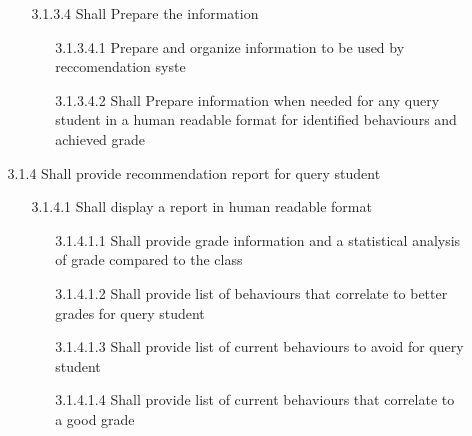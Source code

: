 \documentclass[12pt]{article}
\begin{document}
\begin{enumerate}[itemsep=-1mm]
\begin{enumerate}[itemsep=-1mm]
\begin{enumerate}[itemsep=-1mm]
				\item[3.1.3.4] Shall Prepare the information
				\begin{enumerate}[itemsep=-1mm]
					\item[3.1.3.4.1] Prepare and organize information to be used by reccomendation syste
					\item[3.1.3.4.2] Shall Prepare information when needed for any query student in a human readable format for identified behaviours and achieved grade
				\end{enumerate}
			\end{enumerate}
			\item[3.1.4] Shall provide recommendation report for query student
			\begin{enumerate}[itemsep=-1mm]
				\item[3.1.4.1] Shall display a report in human readable format
				\begin{enumerate}[itemsep=-1mm]
					\item[3.1.4.1.1] Shall provide grade information and a statistical analysis of grade compared to the class
					\item[3.1.4.1.2] Shall provide list of behaviours that correlate to better grades for query student
					\item[3.1.4.1.3] Shall provide list of current behaviours to avoid for query student
					\item[3.1.4.1.4] Shall provide list of current behaviours that correlate to a good grade
					\end{enumerate}
			\end{enumerate}
		\end{enumerate}
		\end{enumerate}
	
\end{document}

